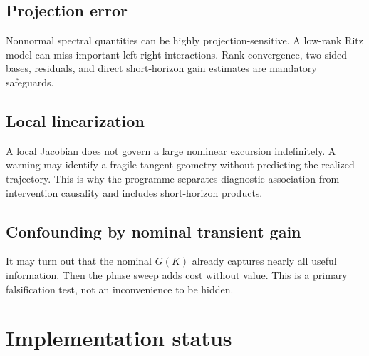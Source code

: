 \subsection{Projection error}

Nonnormal spectral quantities can be highly projection-sensitive.  A low-rank Ritz model can miss important left-right interactions.  Rank convergence, two-sided bases, residuals, and direct short-horizon gain estimates are mandatory safeguards.

\subsection{Local linearization}

A local Jacobian does not govern a large nonlinear excursion indefinitely.  A warning may identify a fragile tangent geometry without predicting the realized trajectory.  This is why the programme separates diagnostic association from intervention causality and includes short-horizon products.

\subsection{Confounding by nominal transient gain}

It may turn out that the nominal \(G(K)\) already captures nearly all useful information.  Then the phase sweep adds cost without value.  This is a primary falsification test, not an inconvenience to be hidden.

\section{Implementation status}

